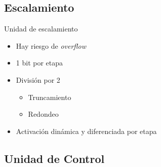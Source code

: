 \subsection{Escalamiento}

\begin{frame}{Unidad de escalamiento}
  \begin{itemize}
    \item<1-> Hay riesgo de \textit{overflow}
    \item<2-> 1 bit por etapa
    \item<3-> División por 2
    \begin{itemize}
      \item<4-> Truncamiento
      \item<5-> Redondeo
    \end{itemize} 
    \item<6-> Activación dinámica y diferenciada por etapa
  \end{itemize}
  
  
\end{frame}

\subsection{Unidad de Control}

